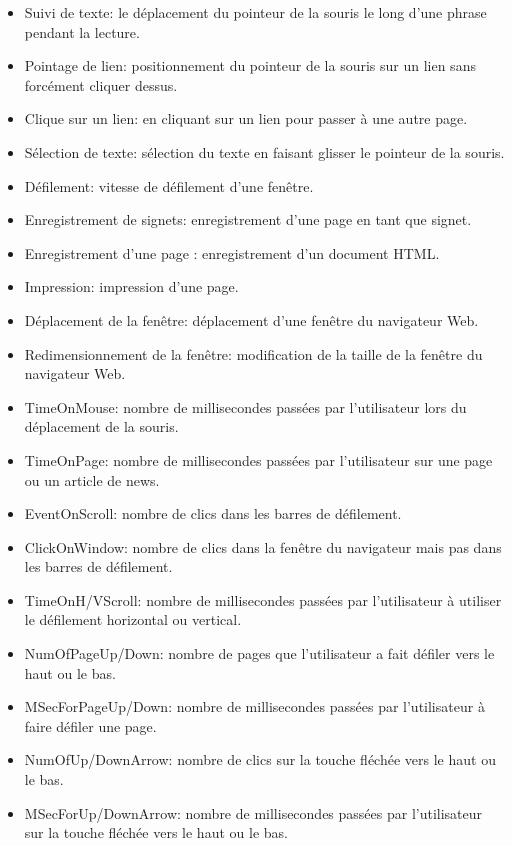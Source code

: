     \begin{itemize}
        \item Suivi de texte: le déplacement du pointeur de la souris le long d'une phrase pendant la lecture.
        \item Pointage de lien: positionnement du pointeur de la souris sur un lien sans forcément cliquer dessus.
        \item Clique sur un lien: en cliquant sur un lien pour passer à une autre page.
        \item Sélection de texte: sélection du texte en faisant glisser le pointeur de la souris.
        \item Défilement: vitesse de défilement d'une fenêtre.
        \item Enregistrement de signets: enregistrement d'une page en tant que signet.
        \item Enregistrement d'une page : enregistrement d'un document HTML.
        \item Impression: impression d'une page.
        \item Déplacement de la fenêtre: déplacement d'une fenêtre du navigateur Web.
        \item Redimensionnement de la fenêtre: modification de la taille de la fenêtre du navigateur Web.
        \item TimeOnMouse: nombre de millisecondes passées par l'utilisateur lors du déplacement de la souris.
        \item TimeOnPage: nombre de millisecondes passées par l'utilisateur sur une page ou un article de news.
        \item EventOnScroll: nombre de clics dans les barres de défilement.
        \item ClickOnWindow: nombre de clics dans la fenêtre du navigateur mais pas dans les barres de défilement.
        \item TimeOnH/VScroll: nombre de millisecondes passées par l'utilisateur à utiliser le défilement horizontal ou vertical.
        \item NumOfPageUp/Down: nombre de pages que l'utilisateur a fait défiler vers le haut ou le bas.
        \item MSecForPageUp/Down: nombre de millisecondes passées par l'utilisateur à faire défiler une page.
        \item NumOfUp/DownArrow: nombre de clics sur la touche fléchée vers le haut ou le bas.
        \item MSecForUp/DownArrow: nombre de millisecondes passées par l'utilisateur sur la touche fléchée vers le haut ou le bas.
    \end{itemize}

